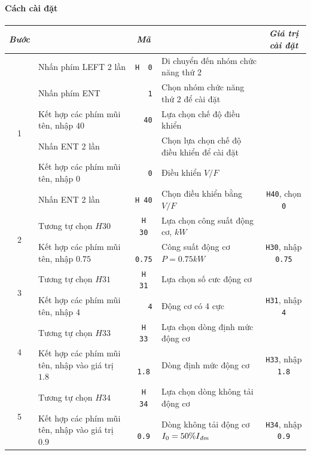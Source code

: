 \documentclass[13pt,a4paper]{extarticle}
\begin{document}
\paragraph{Cách cài đặt}
\begin{center}
\begin{longtable}{|c|p{5cm}|c|p{5cm}|c|} \hline
\textit{Bước} & \centering{Lệnh} & \textit{Mã} & \centering{\textit{Mô tả}} & \textit{Giá trị cài đặt} \\ \hline
\multirow{6}{.6cm}{1} & Nhấn phím LEFT 2 lần & \verb|H  0| & Di chuyển đến nhóm chức năng thứ 2 & \\ \cline{2-5}
  & Nhấn phím ENT & \verb|   1| & Chọn nhóm chức năng thứ 2 để cài đặt & \\ \cline{2-5}
  & Kết hợp các phím mũi tên, nhập $40$ & \verb|  40| & Lựa chọn chế độ điều khiển &  \\ \cline{2-5}
  & Nhấn ENT 2 lần & & Chọn lựa chọn chế độ điều khiển để cài đặt & \\ \cline{2-5}
  & Kết hợp các phím mũi tên, nhập $0$ & \verb|   0| & Điều khiển $V/F$ & \\ \hline
  & Nhấn ENT 2 lần & \verb|H 40| & Chọn điều khiển bằng $V/F$ & \verb|H40|, chọn \verb|0| \\ \cline{2-5}
\multirow{2}{.6cm}{2} & Tương tự chọn $H30$ & \verb|H  30| & Lựa chọn công suất động cơ, $kW$ &  \\ \cline{2-5}     
  & Kết hợp các phím mũi tên, nhập $0.75$ & \verb| 0.75| & Công suất động cơ $P = 0.75kW$ &  \verb|H30|, nhập \verb|0.75| \\ \hline     
\multirow{2}{.6cm}{3} & Tương tự chọn $H31$ & \verb|H  31| & Lựa chọn số cưc động cơ &  \\ \cline{2-5}   
  & Kết hợp các phím mũi tên, nhập $4$ & \verb|   4| & Động cơ có 4 cực &  \verb|H31|, nhập \verb|4| \\ \hline     
\multirow{2}{.6cm}{4} & Tương tự chọn $H33$ & \verb|H  33| & Lựa chọn dòng định mức động cơ &  \\ \cline{2-5}     
  & Kết hợp các phím mũi tên, nhập vào giá trị $1.8$ & \verb|  1.8| & Dòng định mức động cơ &  \verb|H33|, nhập \verb|1.8| \\ \hline
\multirow{2}{.6cm}{5} & Tương tự chọn $H34$ & \verb|H  34| & Lựa chọn dòng không tải động cơ &  \\ \cline{2-5}     
  & Kết hợp các phím mũi tên, nhập vào giá trị $0.9$ & \verb|  0.9| & Dòng không tải động cơ $I_0 = 50\%I_{\text{\textit{đm}}}$ &  \verb|H34|, nhập \verb|0.9| \\ \hline

\end{longtable}
\end{center}
\end{document}
